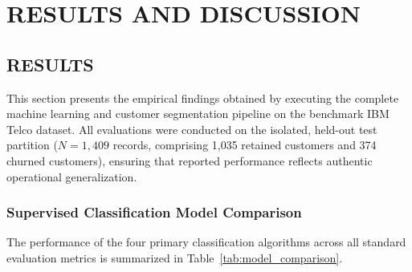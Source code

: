 \documentclass[12pt,a4paper]{report}
\newcommand{\datasetTestCount}{1,409}
\begin{document}
\chapter{RESULTS AND DISCUSSION}
\label{ch:results}

\section{RESULTS}
This section presents the empirical findings obtained by executing the complete machine learning and customer segmentation pipeline on the benchmark IBM Telco dataset. All evaluations were conducted on the isolated, held-out test partition ($N=\datasetTestCount{}$ records, comprising 1,035 retained customers and 374 churned customers), ensuring that reported performance reflects authentic operational generalization.

\subsection{Supervised Classification Model Comparison}
The performance of the four primary classification algorithms across all standard evaluation metrics is summarized in Table~\ref{tab:model_comparison}.

\begin{table}[H]
\centering
\caption{Model Performance on the Held-Out Test Set ($N=1,409$)}
\label{tab:model_comparison}
\end{table}
\end{document}
